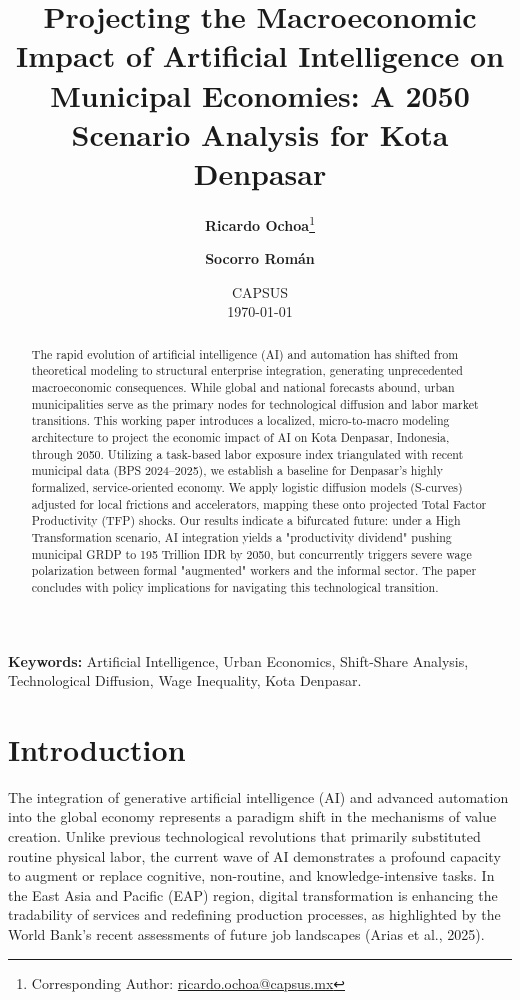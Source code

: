 \documentclass[11pt, a4paper]{article}
\title{\textbf{Projecting the Macroeconomic Impact of Artificial Intelligence on Municipal Economies: A 2050 Scenario Analysis for Kota Denpasar}}
\author{
  \textbf{Ricardo Ochoa}\thanks{Corresponding Author: \href{mailto:ricardo.ochoa@capsus.mx}{ricardo.ochoa@capsus.mx}} \\
  \and 
  \textbf{Socorro Román} \\
}
\date{
  CAPSUS \\
  \vspace{0.5cm}
  \today
}
\begin{document}
\maketitle

\begin{abstract}
The rapid evolution of artificial intelligence (AI) and automation has shifted from theoretical modeling to structural enterprise integration, generating unprecedented macroeconomic consequences. While global and national forecasts abound, urban municipalities serve as the primary nodes for technological diffusion and labor market transitions. This working paper introduces a localized, micro-to-macro modeling architecture to project the economic impact of AI on Kota Denpasar, Indonesia, through 2050. Utilizing a task-based labor exposure index triangulated with recent municipal data (BPS 2024--2025), we establish a baseline for Denpasar's highly formalized, service-oriented economy. We apply logistic diffusion models (S-curves) adjusted for local frictions and accelerators, mapping these onto projected Total Factor Productivity (TFP) shocks. Our results indicate a bifurcated future: under a High Transformation scenario, AI integration yields a "productivity dividend" pushing municipal GRDP to 195 Trillion IDR by 2050, but concurrently triggers severe wage polarization between formal "augmented" workers and the informal sector. The paper concludes with policy implications for navigating this technological transition.
\end{abstract}

\vspace{0.5cm}
\noindent \textbf{Keywords:} Artificial Intelligence, Urban Economics, Shift-Share Analysis, Technological Diffusion, Wage Inequality, Kota Denpasar.

\newpage
\doublespacing

\section{Introduction}
The integration of generative artificial intelligence (AI) and advanced automation into the global economy represents a paradigm shift in the mechanisms of value creation. Unlike previous technological revolutions that primarily substituted routine physical labor, the current wave of AI demonstrates a profound capacity to augment or replace cognitive, non-routine, and knowledge-intensive tasks. In the East Asia and Pacific (EAP) region, digital transformation is enhancing the tradability of services and redefining production processes, as highlighted by the World Bank's recent assessments of future job landscapes (Arias et al., 2025).
\end{document}
